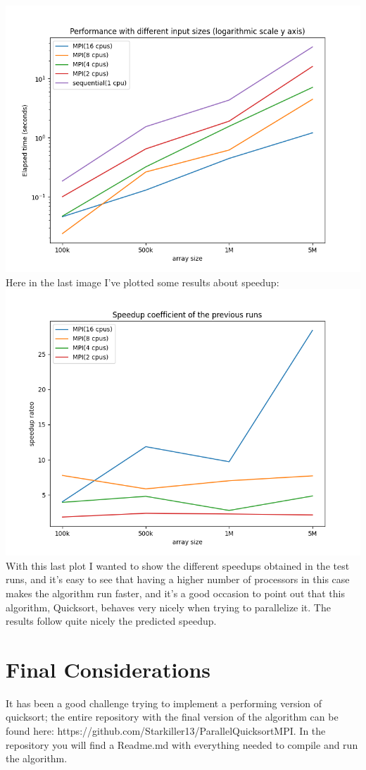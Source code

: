 \documentclass{article}
\begin{document}
\includegraphics[scale=.6]{inputsChartLog.png}
Here in the last image I've plotted some results about speedup:\\
\includegraphics[scale=.6]{speedup.png}
With this last plot I wanted to show the different speedups obtained in the test runs, and it's easy 
to see that having a higher number of processors in this case makes the algorithm run faster, and
it's a good occasion to point out that this algorithm, Quicksort, behaves very nicely when trying 
to parallelize it. The results follow quite nicely the predicted speedup.

\section{Final Considerations}
It has been a good challenge trying to implement a performing version of quicksort; the entire 
repository with the final version of the algorithm can be found here: https://github.com/Starkiller13/ParallelQuicksortMPI.
In the repository you will find a Readme.md with everything needed to compile and run the algorithm.
\end{document}
